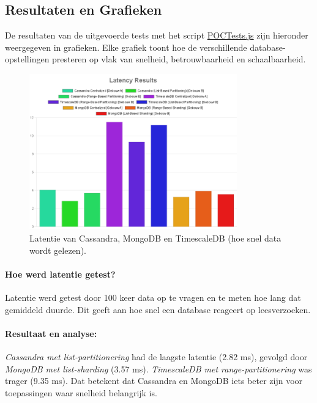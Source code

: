 \subsection{Resultaten en Grafieken}
De resultaten van de uitgevoerde tests met het script \href{https://github.com/WoutVC/bachelorproef2024/blob/main/proof_of_concept/backend/POCTests.js}{POCTests.js} zijn hieronder weergegeven in grafieken. Elke grafiek toont hoe de verschillende database-opstellingen presteren op vlak van snelheid, betrouwbaarheid en schaalbaarheid.

\begin{figure}[H]
	\centering
	\includegraphics[width=0.8\textwidth]{Latency.png}
	\caption{Latentie van Cassandra, MongoDB en TimescaleDB (hoe snel data wordt gelezen).}
	\label{fig:latency-comparison}
\end{figure}

\paragraph{Hoe werd latentie getest?}
Latentie werd getest door 100 keer data op te vragen en te meten hoe lang dat gemiddeld duurde. Dit geeft aan hoe snel een database reageert op leesverzoeken.

\paragraph{Resultaat en analyse:}
\textit{Cassandra met list-partitionering} had de laagste latentie (2.82 ms), gevolgd door \textit{MongoDB met list-sharding} (3.57 ms). \textit{TimescaleDB met range-partitionering} was trager (9.35 ms). Dat betekent dat Cassandra en MongoDB iets beter zijn voor toepassingen waar snelheid belangrijk is.

